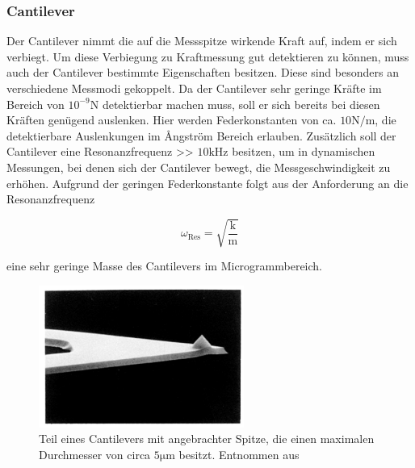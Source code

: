           \FloatBarrier

        
          \newpage
        \subsubsection*{Cantilever}
          Der Cantilever nimmt die auf die Messspitze wirkende Kraft auf, indem er sich verbiegt. Um diese Verbiegung zu Kraftmessung gut detektieren zu können, muss auch der Cantilever bestimmte Eigenschaften
          besitzen. Diese sind besonders an verschiedene Messmodi gekoppelt. Da der Cantilever sehr geringe Kräfte im Bereich von $10^{-9} \si{\newton}$ detektierbar machen muss, soll er sich bereits bei diesen
          Kräften genügend auslenken. Hier werden Federkonstanten von ca. $10 \si{\newton\per\metre}$, die detektierbare Auslenkungen im \AA ngström Bereich erlauben. Zusätzlich soll der Cantilever eine  
          Resonanzfrequenz >> $10 \si{\kilo\hertz}$ besitzen, um in dynamischen Messungen, bei denen sich der Cantilever bewegt, die Messgeschwindigkeit zu erhöhen. Aufgrund der geringen Federkonstante folgt
          aus der Anforderung an die Resonanzfrequenz

          \begin{equation*}
            \omega_{\text{Res}} = \sqrt{\frac{\text{k}}{\text{m}}}
          \end{equation*}

          eine sehr geringe Masse des Cantilevers im Microgrammbereich.


          \begin{figure}[h]
            \centering
            \includegraphics[width = 0.6\textwidth]{pictures/Cantilever_Spitze.png}
            \caption{Teil eines Cantilevers mit angebrachter Spitze, die einen maximalen Durchmesser von circa $5 \si{\micro\metre}$ besitzt. Entnommen aus \cite{wiesendanger_scanning_1998}}
            \label{fig:Cantilever_Spitze}
          \end{figure}
        
